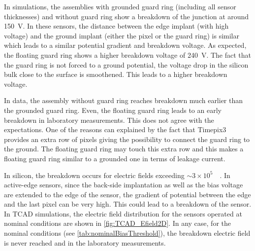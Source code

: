 In simulations, the assemblies with grounded guard ring (including all
sensor thicknesses) and without guard ring show a breakdown of the
junction at around 150~V. In these sensors, the distance between the
edge implant (with high voltage) and the ground implant (either the
pixel or the guard ring) is similar which leads to a similar potential
gradient and breakdown voltage. As expected, the floating guard ring
shows a higher breakdown voltage of 240~V. The fact that the guard
ring is not forced to a ground potential, the voltage drop in the
silicon bulk close to the surface is smoothened. This leads to a
higher breakdown voltage.

In data, the assembly without guard ring reaches breakdown much
earlier than the grounded guard ring. Even, the floating guard ring
leads to an early breakdown in laboratory measurements. This does not
agree with the expectations. One of the reasons can explained by the
fact that Timepix3 provides an extra row of pixels giving the
possibility to connect the guard ring to the ground. The floating
guard ring may touch this extra row and this makes a floating guard
ring similar to a grounded one in terms of leakage current.


In silicon, the breakdown occurs for electric fields exceeding
$\sim3\times10^5$~\voltpercm~\cite{Sze:100213}. In active-edge
sensors, since the back-side implantation as well as the bias voltage
are extended to the edge of the sensor, the gradient of potential
between the edge and the last pixel can be very high. This could lead
to a breakdown of the sensor. In TCAD simulations, the electric field
distribution for the sensors operated at nominal conditions are shown
in \cref{fig:TCAD_Efield2D}. In any case, for the nominal conditions
(see \cref{tab:nominalBiasThreshold}), the breakdown electric field is
never reached and in the laboratory measurements.

